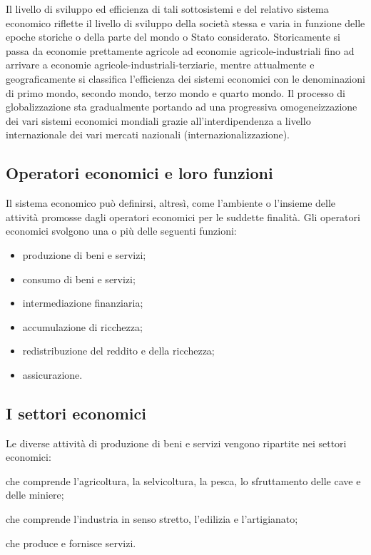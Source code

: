 Il livello di sviluppo ed efficienza di tali sottosistemi e del relativo 
sistema economico riflette il livello di sviluppo della società stessa e 
varia in funzione delle epoche storiche o della parte del mondo o Stato 
considerato. 
Storicamente si passa da economie prettamente agricole ad economie 
agricole-industriali fino ad arrivare a economie 
agricole-industriali-terziarie, mentre attualmente e geograficamente si 
classifica l'efficienza dei sistemi economici con le denominazioni di primo 
mondo, secondo mondo, terzo mondo e quarto mondo. Il processo di 
globalizzazione sta gradualmente portando ad una progressiva 
omogeneizzazione dei vari sistemi economici mondiali grazie 
all'interdipendenza a livello internazionale dei vari mercati nazionali 
(internazionalizzazione).

\subsection{Operatori economici e loro funzioni}


Il sistema economico può definirsi, altresì, come l'ambiente o l'insieme delle 
attività promosse dagli operatori economici per le suddette finalità. Gli 
operatori economici svolgono una o più delle seguenti funzioni:
\begin{itemize} [nosep]
\item produzione di beni e servizi;
\item consumo di beni e servizi;
\item intermediazione finanziaria;
\item accumulazione di ricchezza;
\item redistribuzione del reddito e della ricchezza;
\item assicurazione.
\end{itemize}

\subsection{I settori economici}

Le diverse attività di produzione di beni e servizi vengono ripartite nei 
settori economici:
\begin{description} [noitemsep]
\item [settore primario,] che comprende l'agricoltura, la selvicoltura, 
la pesca, lo sfruttamento delle cave e delle miniere;
\item [settore secondario,] che comprende l'industria in senso stretto, 
l'edilizia e l'artigianato;
\item [settore terziario,] che produce e fornisce servizi.
\end{description}

